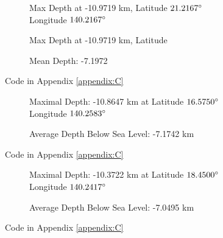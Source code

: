 \documentclass[letterpaper,12pt]{article}
\begin{document}
\begin{figure}[H]
    \centering
    \begin{adjustwidth}{-1in}{-1in}
    \begin{subfigure}[b]{0.65\textwidth}
        \centering
        
        \caption{Max Depth at -10.9719 km, Latitude \(21.2167\degree\) Longitude \(140.2167\degree\)}
        \caption{Max Depth at -10.9719 km, Latitude}
        \label{fig:5a}
    \end{subfigure}
    \begin{subfigure}[b]{0.65\textwidth}
        \centering
        
        \caption{Mean Depth: -7.1972}
        \label{fig:5b}
    \end{subfigure}
    \end{adjustwidth}
    \caption{Code in Appendix \ref{appendix:C}}
    \label{fig:5}
\end{figure}
\begin{figure}[H]
    \begin{adjustwidth}{-1in}{-1in}
    \centering
    \begin{subfigure}[b]{0.60\textwidth}
        \centering
        
        \caption{Maximal Depth: -10.8647 km at Latitude \(16.5750\degree\) Longitude \(140.2583\degree\)}
        \label{fig:6a}
    \end{subfigure}
    \begin{subfigure}[b]{0.60\textwidth}
        \centering
        
        \caption{Average Depth Below Sea Level: -7.1742 km}
        \label{fig:6b}
    \end{subfigure}
    \end{adjustwidth}
    \caption{Code in Appendix \ref{appendix:C}}
    \label{fig:6}
\end{figure}
\begin{figure}[H]
    \begin{adjustwidth}{-1in}{-1in}
    \centering
    \begin{subfigure}[b]{0.65\textwidth}
        \centering
        
        \caption{Maximal Depth: -10.3722 km at Latitude \(18.4500\degree\) Longitude \(140.2417\degree\)}
        \label{fig:7a}
    \end{subfigure}
    \begin{subfigure}[b]{0.65\textwidth}
        \centering
        
        \caption{Average Depth Below Sea Level: -7.0495 km}
        \label{fig:7b}
    \end{subfigure}
    \end{adjustwidth}
    \caption{Code in Appendix \ref{appendix:C}}
    \label{fig:7}
\end{figure}
\end{document}
